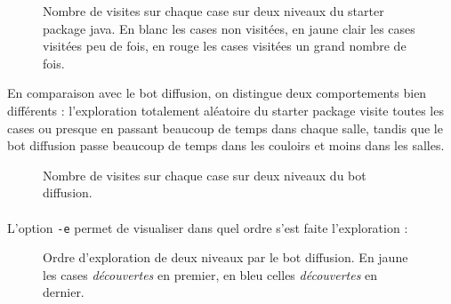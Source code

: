 \documentclass[a4paper,12pt]{article}
\begin{document}
\begin{figure}[H]
	\caption{Nombre de visites sur chaque case sur deux niveaux du starter
	package java. En blanc les cases non visitées, en jaune clair les cases
visitées peu de fois, en rouge les cases visitées un grand nombre de fois.}
	\resizebox{\columnwidth}{!}{}
\end{figure}

En comparaison avec le bot diffusion, on distingue deux comportements bien
différents : l'exploration totalement aléatoire du starter package visite
toutes les cases ou presque en passant beaucoup de temps dans chaque salle,
tandis que le bot diffusion passe beaucoup de temps dans les couloirs et moins
dans les salles.

\begin{figure}[H]
	\caption{Nombre de visites sur chaque case sur deux niveaux du bot diffusion.}
	\resizebox{\columnwidth}{!}{}
\end{figure}

\paragraph{} L'option \verb!-e! permet de visualiser dans quel ordre s'est
faite l'exploration :

\begin{figure}[H]
	\caption{Ordre d'exploration de deux niveaux par le bot diffusion. En
	jaune les cases \emph{découvertes} en premier, en bleu celles
	\emph{découvertes} en dernier.}
	\resizebox{\columnwidth}{!}{}
\end{figure}
\end{document}
